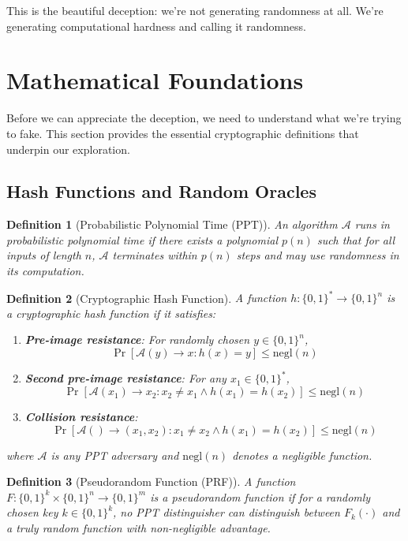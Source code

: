 \documentclass[11pt]{article}
\newtheorem{definition}{Definition}
\begin{document}
This is the beautiful deception: we're not generating randomness at all. We're generating computational hardness and calling it randomness.

\section{Mathematical Foundations}

Before we can appreciate the deception, we need to understand what we're trying to fake. This section provides the essential cryptographic definitions that underpin our exploration.

\subsection{Hash Functions and Random Oracles}

\begin{definition}[Probabilistic Polynomial Time (PPT)]
An algorithm $\mathcal{A}$ runs in probabilistic polynomial time if there exists a polynomial $p(n)$ such that for all inputs of length $n$, $\mathcal{A}$ terminates within $p(n)$ steps and may use randomness in its computation.
\end{definition}

\begin{definition}[Cryptographic Hash Function]
A function $h: \{0,1\}^* \to \{0,1\}^n$ is a cryptographic hash function if it satisfies:
\begin{enumerate}
\item \textbf{Pre-image resistance}: For randomly chosen $y \in \{0,1\}^n$,
$$\Pr[\mathcal{A}(y) \to x : h(x) = y] \leq \text{negl}(n)$$

\item \textbf{Second pre-image resistance}: For any $x_1 \in \{0,1\}^*$,
$$\Pr[\mathcal{A}(x_1) \to x_2 : x_2 \neq x_1 \land h(x_1) = h(x_2)] \leq \text{negl}(n)$$

\item \textbf{Collision resistance}: 
$$\Pr[\mathcal{A}() \to (x_1, x_2) : x_1 \neq x_2 \land h(x_1) = h(x_2)] \leq \text{negl}(n)$$
\end{enumerate}
where $\mathcal{A}$ is any PPT adversary and $\text{negl}(n)$ denotes a negligible function.
\end{definition}

\begin{definition}[Pseudorandom Function (PRF)]
A function $F: \{0,1\}^k \times \{0,1\}^n \to \{0,1\}^m$ is a pseudorandom function if for a randomly chosen key $k \in \{0,1\}^k$, no PPT distinguisher can distinguish between $F_k(\cdot)$ and a truly random function with non-negligible advantage.
\end{definition}
\end{document}
